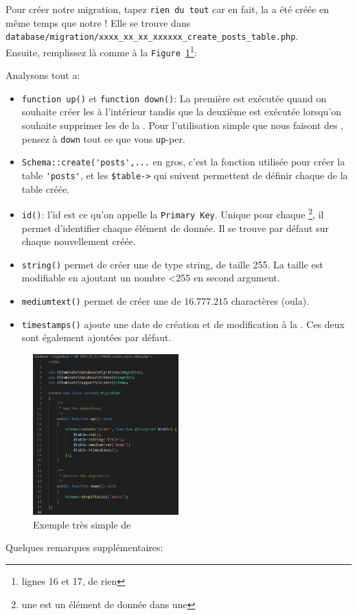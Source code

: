 \documentclass[internal]{nhitec_design}
\begin{document}
Pour créer notre migration, tapez \verb|rien du tout| car en fait, la \migration{} a été créée en même temps que notre \model{}! Elle se trouve dans \\\verb|database/migration/xxxx_xx_xx_xxxxxx_create_posts_table.php|. \\Ensuite, remplissez là comme à la \texttt{Figure~\ref{fig:basic_migration}}\footnote{lignes 16 et 17, de rien}:

Analysons tout a:
\begin{itemize}
    \item \verb|function up()| et \verb|function down()|: La première est exécutée quand on souhaite créer les \tables{} à l'intérieur tandis que la deuxième est exécutée lorsqu'on souhaite supprimer les \tables{} de la \db{}. Pour l'utilisation simple que nous faisont des \migrations{}, pensez à \verb|down| tout ce que vous \verb|up|-per.
    \item \verb|Schema::create('posts',...| en gros, c'est la fonction utilisée pour créer la table \verb|'posts'|, et les \verb|$table->| qui suivent permettent de définir chaque \column{} de la table créée.
    \item \verb|id()|: l'id est ce qu'on appelle la \texttt{Primary Key}. Unique pour chaque \row{}\footnote{une \row{} est un élément de donnée dans une \table{}}, il permet d'identifier chaque élément de donnée. Il se trouve par défaut sur chaque \table{} nouvellement créée.
    \item \verb|string()| permet de créer une \column{} de type string, de taille 255. La taille est modifiable en ajoutant un nombre <255 en second argument.
    \item \verb|mediumtext()| permet de créer une \column{} de $16.777.215$ charactères (oula).
    \item \verb|timestamps()| ajoute une date de création et de modification à la \table{}. Ces deux \columns{} sont également ajoutées par défaut.
\end{itemize}

\begin{figure}
    \vspace{-0.5cm}
    \includegraphics[width=0.5\textwidth]{figures-C1/post_migration.pdf}
    \caption{Exemple très simple de \migration{}\label{fig:basic_migration}}
\end{figure}
Quelques remarques supplémentaires:
\end{document}
